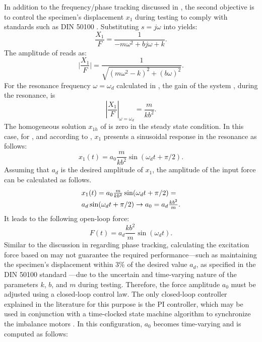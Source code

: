 \documentclass[preprint,12pt]{elsarticle}
\begin{document}
In addition to the frequency/phase tracking discussed in , the second objective is to control the specimen's displacement $x_1$ during testing to comply with standards such as DIN 50100 \cite{DIN_standard}. Substituting $s = j\omega$ into  yields:
\begin{equation}
\frac{X_1}{F}=\frac{1}{-m\omega^2+bj\omega+k} .
\label{E_Laplace_frequency}
\end{equation}
The amplitude of  reads as:
\begin{equation}
\big|\frac{X_1}{F}\big|=\frac{1}{\sqrt{(m\omega^2-k)^2+(b\omega)^2}}.
\label{E_Laplace_frequency_mag}
\end{equation}
For the resonance frequency $\omega=\omega_d$ calculated in , the gain of the system , during the resonance, is
\begin{equation}
|\frac{X_1}{F}|_{\omega=\omega_d}=\frac{m}{kb^2}.
\label{E_Laplace_frequency_mag_resonance}
\end{equation}
The homogeneous solution $x_{1h}$ of  is zero in the steady state condition. In this case, for , and according to , $x_1$ presents a sinusoidal response in the resonance as follows:
\begin{equation}
x_1(t)=a_0 \frac{m}{kb^2} \sin(\omega_d t+\pi/2).
\label{E_x_1_steady_amplitude}
\end{equation}
Assuming that $a_d$ is the desired amplitude of $x_1$, the amplitude of the input force can be calculated as follows.
\begin{equation}
\begin{array}{l}
x_1(t)=a_0 \frac{m}{kb^2} \sin(\omega_d t+\pi/2) =\vspace{0.1cm} \\ 
 a_d  \sin(\omega_d t+\pi/2)  \rightarrow  a_0=a_d \frac{kb^2}{m}. 
\end{array}
\label{E_x_1_steady_a0}
\end{equation}
It leads to the following open-loop force:
\begin{equation}
F(t)=a_d \frac{kb^2}{m} \sin(\omega_dt). 
\label{E_x_1_open_loop_force}
\end{equation}
Similar to the discussion in  regarding phase tracking, calculating the excitation force based on  may not guarantee the required performance—such as maintaining the specimen's displacement within 3\% of the desired value $a_d$, as specified in the DIN 50100 standard \cite{DIN_standard}—due to the uncertain and time-varying nature of the parameters $k$, $b$, and $m$ during testing. Therefore, the force amplitude $a_0$ must be adjusted using a closed-loop control law. The only closed-loop controller explained in the literature for this purpose is the PI controller, which may be used in conjunction with a time-clocked state machine algorithm to synchronize the imbalance motors \cite{SCHRAMM2024117045,SCHNEIDER2018171,herrmann2018simulation_Thesis}. In this configuration, $a_0$ becomes time-varying and is computed as follows:
\end{document}
